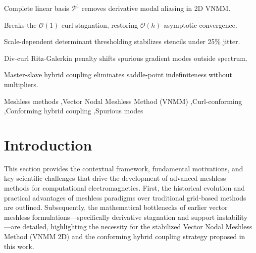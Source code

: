 \documentclass[preprint,12pt]{elsarticle}
\begin{document}
\begin{frontmatter}
\begin{graphicalabstract}
\end{graphicalabstract}

\begin{highlights}
\item Complete linear basis $\mathcal{P}^1$ removes derivative modal aliasing in 2D VNMM.
\item Breaks the $\mathcal{O}(1)$ curl stagnation, restoring $\mathcal{O}(h)$ asymptotic convergence.
\item Scale-dependent determinant thresholding stabilizes stencils under 25\% jitter.
\item Div-curl Ritz-Galerkin penalty shifts spurious gradient modes outside spectrum.
\item Master-slave hybrid coupling eliminates saddle-point indefiniteness without multipliers.
\end{highlights}

\begin{keyword}
Meshless methods \sep Vector Nodal Meshless Method (VNMM) \sep Curl-conforming \sep Conforming hybrid coupling \sep Spurious modes


\end{keyword}

\end{frontmatter}


\section{Introduction}
\label{sec:intro}

This section provides the contextual framework, fundamental motivations, and key scientific challenges that drive the development of advanced meshless methods for computational electromagnetics. First, the historical evolution and practical advantages of meshless paradigms over traditional grid-based methods are outlined. Subsequently, the mathematical bottlenecks of earlier vector meshless formulations---specifically derivative stagnation and support instability---are detailed, highlighting the necessity for the stabilized Vector Nodal Meshless Method (VNMM 2D) and the conforming hybrid coupling strategy proposed in this work.
\end{document}
